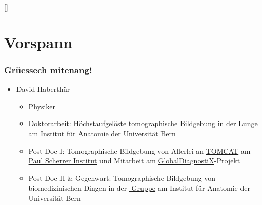 \renewcommand{\bibopenparen}{\addcomma\addspace}
\renewcommand{\bibcloseparen}{\addcomma\addspace}

\DeclareCiteCommand{\footcite}[\mkbibfootnote]{%
	}{%
		\newunit%
		\newunit%
		\printlabeldateextra%
	}{\addsemicolon\space}{%
	}%

\def\zeropad#1#2{%
  \ifnum1#2<1#1
    \zeropad{#1}{0#2}%
  \else%
    #2%
  \fi%
}



{%
	\begin{frame}%
		\maketitle
	\end{frame}%
}

\section{Vorspann}
\begin{frame}
	\frametitle{Grüessech mitenang!}%
	\begin{itemize}%
		\item David Haberthür%
		\begin{itemize}%
			\item Physiker%
			\item \href{https://boris.unibe.ch/2619/}{Doktorarbeit: Höchstaufgelöste tomographische Bildgebung in der Lunge} am Institut für Anatomie der Universität Bern%
			\item Post-Doc I: Tomographische Bildgebung von Allerlei an \href{https://www.psi.ch/sls/tomcat/}{TOMCAT} am \href{https://www.psi.ch/}{Paul Scherrer Institut} und Mitarbeit am \href{http://globaldiagnostix.org}{GlobalDiagnostiX}-Projekt%
			\item Post-Doc II \& Gegenwart: Tomographische Bildgebung von biomedizinischen Dingen in der \href{https://www.ana.unibe.ch/forschung/mikroct/research/}{\uct-Gruppe} am Institut für Anatomie der Universität Bern%
		\end{itemize}%
	\end{itemize}%
\end{frame}

